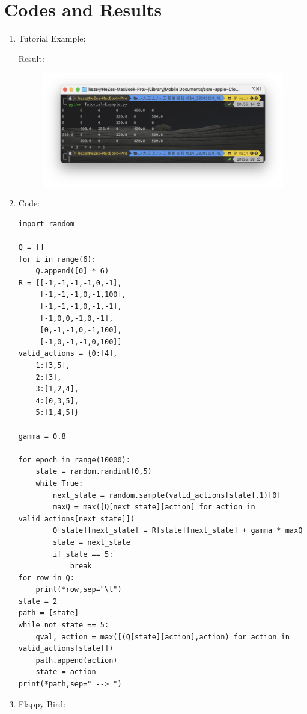 \documentclass[a4paper, 11pt]{article}
\begin{document}
\section{Codes and Results}
\begin{enumerate}
	\item Tutorial Example:
	
	Result:
	\begin{figure}[H]
	  \centering
	  \includegraphics[width=0.95\linewidth]{1.png}
	  \qquad
	\end{figure}
	\item Code:

\begin{lstlisting}
import random

Q = []
for i in range(6):
    Q.append([0] * 6)
R = [[-1,-1,-1,-1,0,-1],
     [-1,-1,-1,0,-1,100],
     [-1,-1,-1,0,-1,-1],
     [-1,0,0,-1,0,-1],
     [0,-1,-1,0,-1,100],
     [-1,0,-1,-1,0,100]]
valid_actions = {0:[4],
    1:[3,5],
    2:[3],
    3:[1,2,4],
    4:[0,3,5],
    5:[1,4,5]}

gamma = 0.8

for epoch in range(10000):
    state = random.randint(0,5)
    while True:
        next_state = random.sample(valid_actions[state],1)[0]
        maxQ = max([Q[next_state][action] for action in valid_actions[next_state]])
        Q[state][next_state] = R[state][next_state] + gamma * maxQ
        state = next_state
        if state == 5:
            break
for row in Q:
    print(*row,sep="\t")
state = 2
path = [state]
while not state == 5:
    qval, action = max([(Q[state][action],action) for action in valid_actions[state]])
    path.append(action)
    state = action
print(*path,sep=" --> ")
\end{lstlisting}
\item Flappy Bird:


\end{enumerate}
\end{document}

